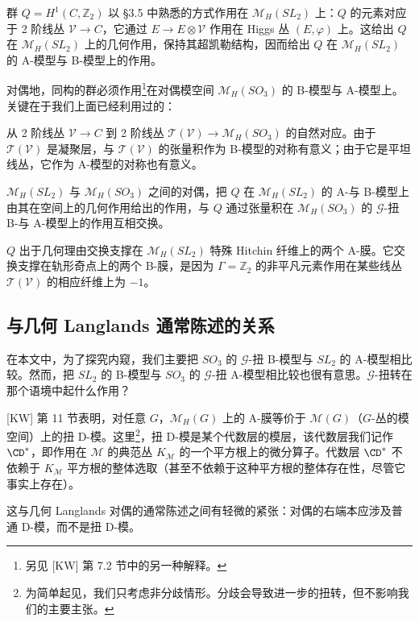 群 $Q=H^1(C,\mathbb{Z}_2)$ 以 §3.5 中熟悉的方式作用在 $\mathcal{M}_H(SL_2)$ 上：$Q$ 的元素对应于 2 阶线丛 $\mathcal{V}\to C$，它通过 $E\to E\otimes\mathcal{V}$ 作用在 Higgs 丛 $(E,\varphi)$ 上。这给出 $Q$ 在 $\mathcal{M}_H(SL_2)$ 上的几何作用，保持其超凯勒结构，因而给出 $Q$ 在 $\mathcal{M}_H(SL_2)$ 的 A-模型与 B-模型上的作用。

对偶地，同构的群必须作用\footnote{另见 [KW] 第 7.2 节中的另一种解释。}在对偶模空间 $\mathcal{M}_H(SO_3)$ 的 B-模型与 A-模型上。关键在于我们上面已经利用过的：


从 2 阶线丛 $\mathcal{V}\to C$ 到 2 阶线丛 $\mathcal{T}(\mathcal{V})\to\mathcal{M}_H(SO_3)$ 的自然对应。由于 $\mathcal{T}(\mathcal{V})$ 是凝聚层，与 $\mathcal{T}(\mathcal{V})$ 的张量积作为 B-模型的对称有意义；由于它是平坦线丛，它作为 A-模型的对称也有意义。

$\mathcal{M}_H(SL_2)$ 与 $\mathcal{M}_H(SO_3)$ 之间的对偶，把 $Q$ 在 $\mathcal{M}_H(SL_2)$ 的 A-与 B-模型上由其在空间上的几何作用给出的作用，与 $Q$ 通过张量积在 $\mathcal{M}_H(SO_3)$ 的 $\mathcal{G}$-扭 B-与 A-模型上的作用互相交换。

$Q$ 出于几何理由交换支撑在 $\mathcal{M}_H(SL_2)$ 特殊 Hitchin 纤维上的两个 A-膜。它交换支撑在轨形奇点上的两个 B-膜，是因为 $\Gamma=\mathbb{Z}_2$ 的非平凡元素作用在某些线丛 $\mathcal{T}(\mathcal{V})$ 的相应纤维上为 $-1$。

\subsection{与几何 Langlands 通常陈述的关系}

在本文中，为了探究内窥，我们主要把 $SO_3$ 的 $\mathcal{G}$-扭 B-模型与 $SL_2$ 的 A-模型相比较。然而，把 $SL_2$ 的 B-模型与 $SO_3$ 的 $\mathcal{G}$-扭 A-模型相比较也很有意思。$\mathcal{G}$-扭转在那个语境中起什么作用？

[KW] 第 11 节表明，对任意 $G$，$\mathcal{M}_H(G)$ 上的 A-膜等价于 $\mathcal{M}(G)$（$G$-丛的模空间）上的扭 D-模。这里\footnote{为简单起见，我们只考虑非分歧情形。分歧会导致进一步的扭转，但不影响我们的主要主张。}，扭 D-模是某个代数层的模层，该代数层我们记作 $\CD^*$，即作用在 $\mathcal{M}$ 的典范丛 $K_{\mathcal{M}}$ 的一个平方根上的微分算子。代数层 $\CD^*$ 不依赖于 $K_{\mathcal{M}}$ 平方根的整体选取（甚至不依赖于这种平方根的整体存在性，尽管它事实上存在）。

这与几何 Langlands 对偶的通常陈述之间有轻微的紧张：对偶的右端本应涉及普通 D-模，而不是扭 D-模。

